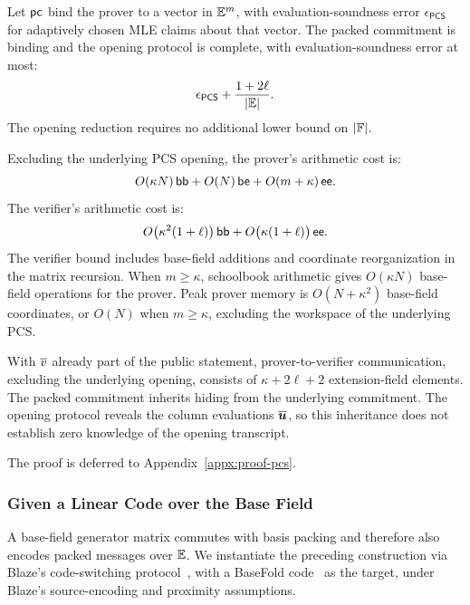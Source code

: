 \begin{proposition}
\label{proposition:packed-pcs}
Let \({\sf pc}\) bind the prover to a vector in \(\mathbb{E}^m\),
with evaluation-soundness error \(\epsilon_{\mathsf{PCS}}\) for
adaptively chosen MLE claims about that vector.
The packed commitment is binding and the opening protocol is
complete, with evaluation-soundness error at most:
\begin{equation}
    \epsilon_{\mathsf{PCS}}
    +\frac{1+2\ell}{|\mathbb{E}|}.
\label{eq:pcs-soundness}
\end{equation}
The opening reduction requires no additional lower bound on
\(|{\mathbb{F}}|\).

Excluding the underlying PCS opening, the prover's arithmetic cost is:
\begin{equation}
    O(\kappa N)\,\mathsf{bb}
    +O(N)\,\mathsf{be}
    +O(m+\kappa)\,\mathsf{ee}.
\label{eq:pcs-prover-cost}
\end{equation}
The verifier's arithmetic cost is:
\begin{equation}
    O\bigl(\kappa^2(1+\ell)\bigr)\,\mathsf{bb}
    +O\bigl(\kappa(1+\ell)\bigr)\,\mathsf{ee}.
\label{eq:pcs-verifier-cost}
\end{equation}
The verifier bound includes base-field additions and coordinate
reorganization in the matrix recursion.
When \(m\geq\kappa\), schoolbook arithmetic gives
\(O(\kappa N)\) base-field operations for the prover.
Peak prover memory is \(O(N+\kappa^2)\) base-field coordinates,
or \(O(N)\) when \(m\geq\kappa\), excluding the workspace of the
underlying PCS.

With \(\overline{v}\) already part of the public statement,
prover-to-verifier communication, excluding the underlying
opening, consists of \(\kappa+2\ell+2\) extension-field elements.
The packed commitment inherits hiding from the underlying
commitment. The opening protocol reveals the column evaluations
\(\overline{\bm u}\), so this inheritance does not establish
zero knowledge of the opening transcript.
\end{proposition}

The proof is deferred to Appendix~\ref{appx:proof-pcs}.

\subsubsection{Given a Linear Code over the Base Field}

A base-field generator matrix commutes with basis packing and
therefore also encodes packed messages over \(\mathbb{E}\).
We instantiate the preceding construction via Blaze's code-switching
protocol~\cite{eurocrypt/BrehmCFRRZ25}, with a BaseFold
code~\cite{crypto/ZeilbergerCF24} as the target, under Blaze's
source-encoding and proximity assumptions.

